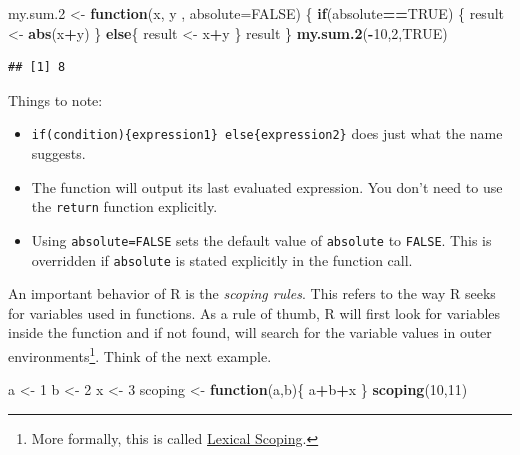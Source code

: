 \documentclass[]{book}
\newenvironment{Shaded}{\begin{snugshade}}{\end{snugshade}}
\newcommand{\KeywordTok}[1]{\textcolor[rgb]{0.13,0.29,0.53}{\textbf{#1}}}
\newcommand{\DataTypeTok}[1]{\textcolor[rgb]{0.13,0.29,0.53}{#1}}
\newcommand{\DecValTok}[1]{\textcolor[rgb]{0.00,0.00,0.81}{#1}}
\newcommand{\StringTok}[1]{\textcolor[rgb]{0.31,0.60,0.02}{#1}}
\newcommand{\OtherTok}[1]{\textcolor[rgb]{0.56,0.35,0.01}{#1}}
\newcommand{\ControlFlowTok}[1]{\textcolor[rgb]{0.13,0.29,0.53}{\textbf{#1}}}
\newcommand{\OperatorTok}[1]{\textcolor[rgb]{0.81,0.36,0.00}{\textbf{#1}}}
\newcommand{\NormalTok}[1]{#1}
\theoremstyle{definition}
\theoremstyle{definition}
\theoremstyle{definition}
\theoremstyle{remark}
\begin{document}
\begin{Shaded}
\begin{Highlighting}[]
\NormalTok{my.sum.}\DecValTok{2}\NormalTok{ <-}\StringTok{ }\ControlFlowTok{function}\NormalTok{(x, y , }\DataTypeTok{absolute=}\OtherTok{FALSE}\NormalTok{) \{}
  \ControlFlowTok{if}\NormalTok{(absolute}\OperatorTok{==}\OtherTok{TRUE}\NormalTok{) \{}
\NormalTok{    result <-}\StringTok{ }\KeywordTok{abs}\NormalTok{(x}\OperatorTok{+}\NormalTok{y)}
\NormalTok{  \}}
  \ControlFlowTok{else}\NormalTok{\{}
\NormalTok{    result <-}\StringTok{ }\NormalTok{x}\OperatorTok{+}\NormalTok{y}
\NormalTok{  \} }
\NormalTok{  result}
\NormalTok{\}}
\KeywordTok{my.sum.2}\NormalTok{(}\OperatorTok{-}\DecValTok{10}\NormalTok{,}\DecValTok{2}\NormalTok{,}\OtherTok{TRUE}\NormalTok{)}
\end{Highlighting}
\end{Shaded}

\begin{verbatim}
## [1] 8
\end{verbatim}

Things to note:

\begin{itemize}
\item
  \texttt{if(condition)\{expression1\}\ else\{expression2\}} does just
  what the name suggests.
\item
  The function will output its last evaluated expression. You don't need
  to use the \texttt{return} function explicitly.
\item
  Using \texttt{absolute=FALSE} sets the default value of
  \texttt{absolute} to \texttt{FALSE}. This is overridden if
  \texttt{absolute} is stated explicitly in the function call.
\end{itemize}

An important behavior of R is the \emph{scoping rules}. This refers to
the way R seeks for variables used in functions. As a rule of thumb, R
will first look for variables inside the function and if not found, will
search for the variable values in outer environments\footnote{More
  formally, this is called
  \href{https://darrenjw.wordpress.com/2011/11/23/lexical-scope-and-function-closures-in-r/}{Lexical
  Scoping}.}. Think of the next example.

\begin{Shaded}
\begin{Highlighting}[]
\NormalTok{a <-}\StringTok{ }\DecValTok{1}
\NormalTok{b <-}\StringTok{ }\DecValTok{2}
\NormalTok{x <-}\StringTok{ }\DecValTok{3}
\NormalTok{scoping <-}\StringTok{ }\ControlFlowTok{function}\NormalTok{(a,b)\{}
\NormalTok{  a}\OperatorTok{+}\NormalTok{b}\OperatorTok{+}\NormalTok{x}
\NormalTok{\}}
\KeywordTok{scoping}\NormalTok{(}\DecValTok{10}\NormalTok{,}\DecValTok{11}\NormalTok{)}
\end{Highlighting}
\end{Shaded}
\end{document}
